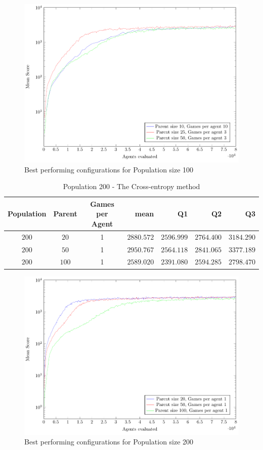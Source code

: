 \begin{figure}[H]
\centering
\includegraphics[scale=1]{data/ce_population_offspring/bestofeach_population/100x/PlotFile.pdf}
\caption{Best performing configurations for Population size 100}
\end{figure}

\clearpage

\begin{table}[H]
\centering
\small
\begin{tabular}{c c c r r r r}
Population & Parent & Games per Agent & mean & Q1 & Q2 & Q3\\
\hline
$200$ & $20$ & 1 & $2880.572$ & $2596.999$ & $2764.400$ & $3184.290$\\
$200$ & $50$ & 1 & $2950.767$ & $2564.118$ & $2841.065$ & $3377.189$\\
$200$ & $100$ & 1 & $2589.020$ & $2391.080$ & $2594.285$ & $2798.470$\\
\end{tabular}
\caption{Population 200 - The Cross-entropy method}
\end{table}

\begin{figure}[H]
\centering
\includegraphics[scale=1]{data/ce_population_offspring/bestofeach_population/200x/PlotFile.pdf}
\caption{Best performing configurations for Population size 200}
\end{figure}

